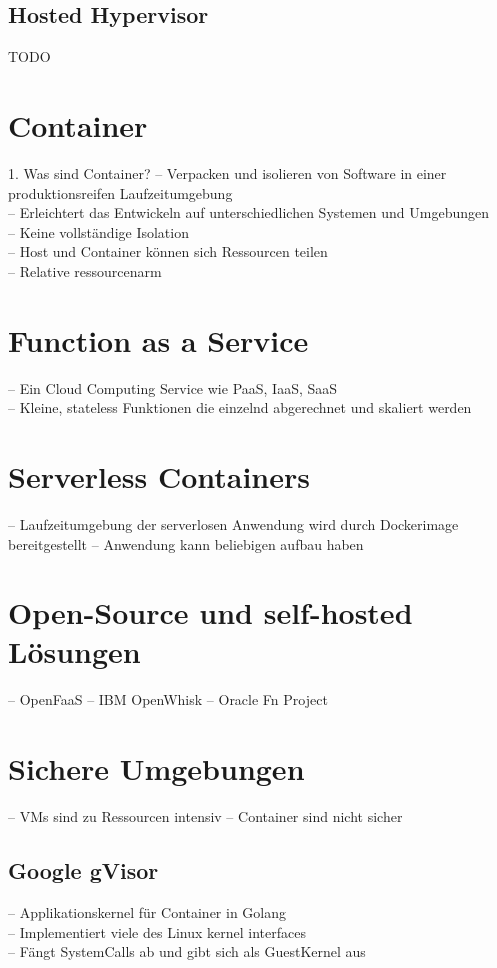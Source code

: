 \subsection{Hosted Hypervisor}
TODO

\section{Container}
1. Was sind Container?
-- Verpacken und isolieren von Software in einer produktionsreifen Laufzeitumgebung\\
-- Erleichtert das Entwickeln auf unterschiedlichen Systemen und Umgebungen\\
-- Keine vollständige Isolation\\
-- Host und Container können sich Ressourcen teilen\\
-- Relative ressourcenarm\\

\section{Function as a Service}
-- Ein Cloud Computing Service wie PaaS, IaaS, SaaS\\
-- Kleine, stateless Funktionen die einzelnd abgerechnet und skaliert werden\\

\section{Serverless Containers}
-- Laufzeitumgebung der serverlosen Anwendung wird durch Dockerimage bereitgestellt
-- Anwendung kann beliebigen aufbau haben

\section{Open-Source und self-hosted Lösungen}
-- OpenFaaS
-- IBM OpenWhisk
-- Oracle Fn Project

\section{Sichere Umgebungen}
-- VMs sind zu Ressourcen intensiv
-- Container sind nicht sicher

\subsection{Google gVisor}
-- Applikationskernel für Container in Golang\\
-- Implementiert viele des Linux kernel interfaces\\
-- Fängt SystemCalls ab und gibt sich als GuestKernel aus\\

